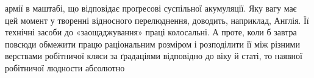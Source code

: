 армії в маштабі, що відповідає проґресові суспільної
акумуляції. Яку вагу має цей момент у творенні відносного перелюднення,
доводить, наприклад, Англія. Її технічні засоби до
«заощаджування» праці колосальні. А проте, коли б завтра
повсюди обмежити працю раціональним розміром і розподілити
її між різними верствами робітничої кляси за ґрадаціями відповідно
до віку й статі, то наявної робітничої людности абсолютно
\parbreak{}  %
